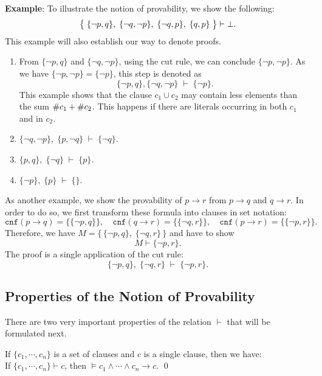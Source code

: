 \noindent
\textbf{Example}:  To illustrate the notion of provability, we show the following: 
\[ \bigl\{\; \{\neg p, q\},\; \{ \neg q, \neg p \},\; \{ \neg q, p \},\; \{ q, p \}\; \bigr\} \vdash \bot.
\]
This example will also establish our way to denote proofs.
\begin{enumerate}
\item From $\{\neg p, q \}$ and $\{ \neg q, \neg p \}$, using the cut rule, we can conclude
      $\{ \neg p, \neg p \}$.   As we have $\{ \neg p, \neg p \} = \{ \neg p \}$, this step is denoted as 
      \[ \{\neg p, q \}, \{ \neg q, \neg p \} \;\vdash\; \{ \neg p \}. \]
      This example shows that the clause  $c_1 \cup c_2$ may contain less elements than the sum
      $\symbol{35}c_1 + \symbol{35}c_2$.  This happens if there are literals occurring in both  $c_1$
      and in $c_2$.
\item $\{\neg q, \neg p \},\; \{ p, \neg q \} \;\vdash\; \{ \neg q \}$. 
\item $\{ p, q \},\; \{ \neg q \} \;\vdash\; \{ p \}$. 
\item $\{ \neg p \},\; \{ p \} \;\vdash\; \{\}$. 
\end{enumerate}
As another example, we show the provability of  $p \rightarrow r$ from $p \rightarrow q$ and $q
\rightarrow r$.
In order to do so, we first transform these formula into clauses in set notation: 
\[ \mathtt{cnf}(p \rightarrow q) = \bigl\{ \{ \neg p, q \} \bigr\}, \quad
   \mathtt{cnf}(q \rightarrow r) = \bigl\{ \{ \neg q, r \} \bigr\}, \quad 
   \mathtt{cnf}(p \rightarrow r) = \bigl\{ \{ \neg p, r \} \bigr\}.
\]
Therefore, we have $M = \bigl\{\, \{ \neg p, q \},\; \{ \neg q, r \}\,\bigr\}$ and have to show
\[ M \vdash  \{ \neg p, r \}. \]
The proof is a single application of the cut rule:
\[ \{ \neg p, q \},\; \{ \neg q, r \} \;\vdash\; \{ \neg p, r \}. \]

\subsection{Properties of the Notion of Provability}
There are two very important properties of the relation $\vdash$ that will be formulated next.

\begin{Theorem}[Correctness]
If  $\{c_1, \cdots, c_n \}$ is a set of clauses and $c$ is a single clause,
then we have: \\[0.2cm]
\hspace*{3.3cm} If $\{c_1, \cdots, c_n \} \vdash c$, \quad then $\models c_1 \wedge \cdots \wedge c_n \rightarrow c$.  \qed
\end{Theorem}


